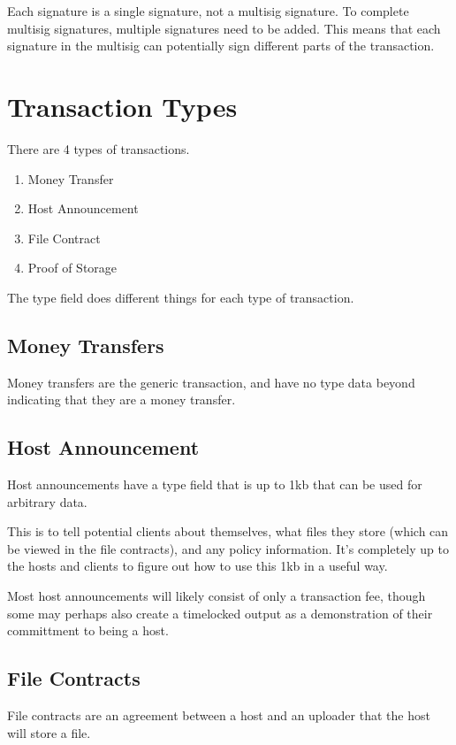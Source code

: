 \documentclass[twocolumn]{article}
\begin{document}
Each signature is a single signature, not a multisig signature.
To complete multisig signatures, multiple signatures need to be added.
This means that each signature in the multisig can potentially sign different parts of the transaction.

\section{Transaction Types}
There are 4 types of transactions.
\begin{enumerate}
	\item Money Transfer
	\item Host Announcement
	\item File Contract
	\item Proof of Storage
\end{enumerate}

The type field does different things for each type of transaction.

\subsection{Money Transfers}
Money transfers are the generic transaction, and have no type data beyond indicating that they are a money transfer.

\subsection{Host Announcement}
Host announcements have a type field that is up to 1kb that can be used for arbitrary data.

This is to tell potential clients about themselves, what files they store (which can be viewed in the file contracts), and any policy information.
It's completely up to the hosts and clients to figure out how to use this 1kb in a useful way.

Most host announcements will likely consist of only a transaction fee, though some may perhaps also create a timelocked output as a demonstration of their committment to being a host.

\subsection{File Contracts}
File contracts are an agreement between a host and an uploader that the host will store a file.
\end{document}

